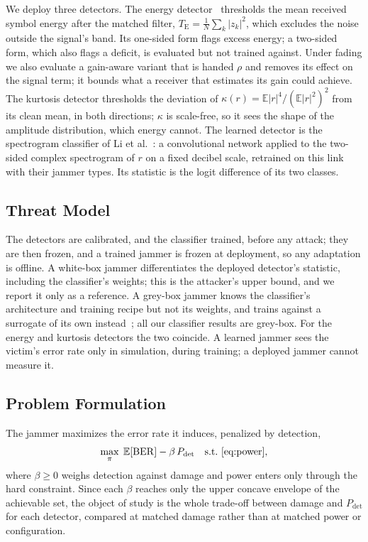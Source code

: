 We deploy three detectors.
The energy detector~\cite{urkowitz1967energy} thresholds the mean received symbol energy after the matched filter, $T_{\mathrm{E}}=\frac1N\sum_k|z_k|^2$, which excludes the noise outside the signal's band.
Its one-sided form flags excess energy; a two-sided form, which also flags a deficit, is evaluated but not trained against.
Under fading we also evaluate a gain-aware variant that is handed $\rho$ and removes its effect on the signal term; it bounds what a receiver that estimates its gain could achieve.
The kurtosis detector thresholds the deviation of $\kappa(r)=\mathbb{E}|r|^4/(\mathbb{E}|r|^2)^2$ from its clean mean, in both directions; $\kappa$ is scale-free, so it sees the shape of the amplitude distribution, which energy cannot.
The learned detector is the spectrogram classifier of Li et al.~\cite{li2022jamming_ofdm}: a convolutional network applied to the two-sided complex spectrogram of $r$ on a fixed decibel scale, retrained on this link with their jammer types.
Its statistic is the logit difference of its two classes.

\subsection{Threat Model}\label{sec:threat}
The detectors are calibrated, and the classifier trained, before any attack; they are then frozen, and a trained jammer is frozen at deployment, so any adaptation is offline.
A white-box jammer differentiates the deployed detector's statistic, including the classifier's weights; this is the attacker's upper bound, and we report it only as a reference.
A grey-box jammer knows the classifier's architecture and training recipe but not its weights, and trains against a surrogate of its own instead~\cite{papernot2017practical}; all our classifier results are grey-box.
For the energy and kurtosis detectors the two coincide.
A learned jammer sees the victim's error rate only in simulation, during training; a deployed jammer cannot measure it.

\subsection{Problem Formulation}\label{sec:objective}
The jammer maximizes the error rate it induces, penalized by detection,
\begin{equation}
\max_{\pi}\;\mathbb{E}[\mathrm{BER}]-\beta\,P_{\mathrm{det}}\quad\text{s.t.~\eqref{eq:power}},
\label{eq:problem}
\end{equation}
where $\beta\ge0$ weighs detection against damage and power enters only through the hard constraint.
Since each $\beta$ reaches only the upper concave envelope of the achievable set, the object of study is the whole trade-off between damage and $P_{\mathrm{det}}$ for each detector, compared at matched damage rather than at matched power or configuration.
